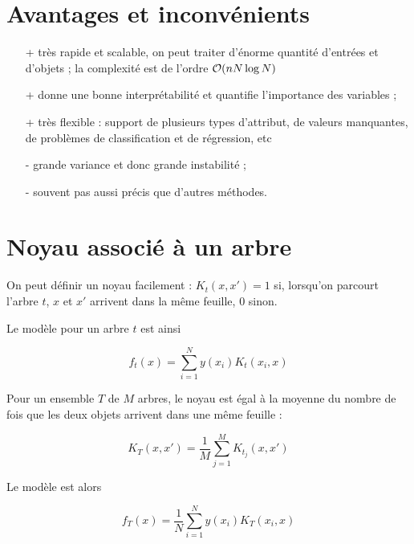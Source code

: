 	
	\section{Avantages et inconvénients}
	
	\begin{itemize}
		\item[+] très rapide et scalable, on peut traiter d'énorme quantité d'entrées et d'objets ; la complexité est de l'ordre $\mathcal{O} (nN\log N)$
		\item[+] donne une bonne interprétabilité et quantifie l'importance des variables ;
		\item[+] très flexible : support de plusieurs types d'attribut, de valeurs manquantes, de problèmes de classification et de régression, etc
		\item[-] grande variance et donc grande instabilité ;
		\item[-] souvent pas aussi précis que d'autres méthodes.
	\end{itemize}
	

	\section{Noyau associé à un arbre}
	
	On peut définir un noyau facilement : $K_t(x, x') = 1$ si, lorsqu'on parcourt l'arbre $t$, $x$ et $x'$ arrivent dans la même feuille, $0$ sinon.
	
	Le modèle pour un arbre $t$ est ainsi
	
	$$f_t(x) = \sum_{i = 1}^N y(x_i) K_t(x_i, x)$$
	
	Pour un ensemble $T$ de $M$ arbres, le noyau est égal à la moyenne du nombre de fois que les deux objets arrivent dans une même feuille :
	
	$$K_T(x, x') = \frac{1}{M} \sum_{j = 1}^M K_{t_j}(x, x')$$
	
	Le modèle est alors
	
	$$f_T(x) = \frac{1}{N} \sum_{i = 1}^N y(x_i) K_T(x_i, x)$$